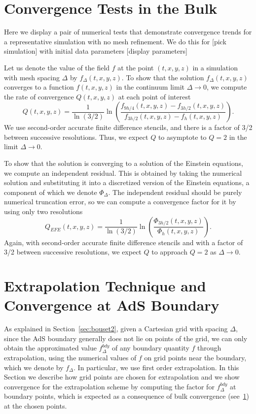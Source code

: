 \documentclass[12pt]{iopart} %
\begin{document}
\section{Convergence Tests in the Bulk}\label{sec:convbulk}

Here we display a pair of numerical tests that demonstrate convergence trends for a representative simulation with no mesh refinement.
We do this for [pick simulation] with initial data parameters [display parameters]

Let us denote the value of the field $f$ at the point $(t,x,y,z)$ in a simulation with mesh spacing $\Delta$ by $f_\Delta(t,x,y,z)$.
To show that the solution $f_\Delta(t,x,y,z)$ converges to a function $f(t,x,y,z)$ in the continuum limit $\Delta\rightarrow0$, we compute the rate of convergence $Q(t,x,y,z)$ at each point of interest
\begin{equation}\label{eq:qconv}
Q(t,x,y,z)=\frac{1}{\ln(3/2)}\ln\left( \frac{f_{9h/4}(t,x,y,z)-f_{3h/2}(t,x,y,z)}{f_{3h/2}(t,x,y,z)-f_{h}(t,x,y,z)} \right).
\end{equation}
We use second-order accurate finite difference stencils, and there is a factor of 3/2 between successive resolutions.
Thus, we expect $Q$ to asymptote to $Q=2$ in the limit $\Delta\rightarrow0$.

To show that the solution is converging to a solution of the Einstein equations, we compute an independent residual. 
This is obtained by taking the numerical solution and substituting it into a discretized version of
the Einstein equations, a component of which we denote $\Phi_\Delta$. 
The independent residual should be purely numerical truncation error, so we can compute a convergence factor for it by using only two resolutions
\begin{equation}\label{eq:qires}
Q_{EFE}(t,x,y,z)=\frac{1}{\ln(3/2)}\ln\left( \frac{\Phi_{3h/2}(t,x,y,z)}{\Phi_{h}(t,x,y,z)} \right).
\end{equation}
Again, with second-order accurate finite difference stencils and with a factor of 3/2 between successive resolutions, we expect $Q$ to approach $Q=2$ as $\Delta\rightarrow0$.

\section{Extrapolation Technique and Convergence at AdS Boundary}\label{sec:extrapconvbdy}

As explained in Section~\ref{sec:bouset2}, given a Cartesian grid with spacing $\Delta$, since the AdS boundary generally does not lie on points of the grid, we can only obtain the approximated value $f^{bdy}_{\Delta}$ of any boundary quantity $f$ through extrapolation, using the numerical values of $f$ on grid points near the boundary, which we denote by $f_\Delta$. In particular, we use first order extrapolation. In this Section we describe how grid points are chosen for extrapolation and we show convergence for the extrapolation scheme by computing the factor  for $f^{bdy}_{\Delta}$ at boundary points, which is expected as a consequence of bulk convergence (see~\ref{sec:convbulk}) at the chosen points.
\end{document}
